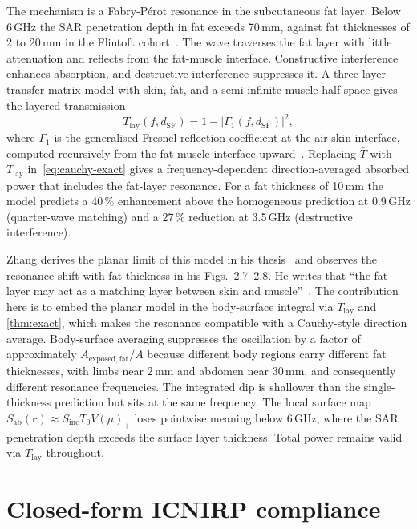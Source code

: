 \documentclass[journal,twocolumn,10pt]{IEEEtran}
\theoremstyle{plain}
\theoremstyle{remark}
\newcommand{\rr}{\mathbf{r}}
\newcommand{\Sinc}{S_{\mathrm{inc}}}
\newcommand{\Sab}{S_{\mathrm{ab}}}
\newcommand{\Tbar}{\bar{T}}
\newcommand{\pospart}[1]{\left(#1\right)_{+}}
\newcommand{\Vis}{V}
\begin{document}
The mechanism is a Fabry-P\'erot resonance in the subcutaneous fat
layer. Below 6\,GHz the SAR penetration depth in fat exceeds 70\,mm,
against fat thicknesses of 2 to 20\,mm in the Flintoft
cohort~\cite[Table~1]{Flintoft2014}. The wave traverses the fat layer
with little attenuation and reflects from the fat-muscle interface.
Constructive interference enhances absorption, and destructive
interference suppresses it. A three-layer transfer-matrix model with
skin, fat, and a semi-infinite muscle half-space gives the layered
transmission
\begin{equation}\label{eq:T-lay}
  T_{\mathrm{lay}}(f, d_{\mathrm{SF}})
  = 1 - \bigl|\widetilde{\Gamma}_1(f, d_{\mathrm{SF}})\bigr|^2,
\end{equation}
where $\widetilde{\Gamma}_1$ is the generalised Fresnel reflection
coefficient at the air-skin interface, computed recursively from the
fat-muscle interface upward~\cite{Chew1995,BornWolf1999}. Replacing
$\Tbar$ with $T_{\mathrm{lay}}$ in~\eqref{eq:cauchy-exact} gives a
frequency-dependent direction-averaged absorbed power that includes
the fat-layer resonance. For a fat thickness of 10\,mm the model
predicts a 40\,\% enhancement above the homogeneous prediction at
0.9\,GHz (quarter-wave matching) and a 27\,\% reduction at 3.5\,GHz
(destructive interference).

Zhang derives the planar limit of this model in his
thesis~\cite[Sec.~2.2]{Zhang2017thesis} and observes the resonance
shift with fat thickness in his Figs.~2.7--2.8. He writes that
``the fat layer may act as a matching layer between skin and
muscle''~\cite[p.~21]{Zhang2017thesis}. The contribution here is to
embed the planar model in the body-surface integral via
$T_{\mathrm{lay}}$ and \cref{thm:exact}, which makes the resonance
compatible with a Cauchy-style direction average. Body-surface
averaging suppresses the oscillation by a factor of approximately
$A_{\mathrm{exposed,fat}}/A$ because different body regions carry
different fat thicknesses, with limbs near 2\,mm and abdomen near
30\,mm, and consequently different resonance frequencies. The
integrated dip is shallower than the single-thickness prediction but
sits at the same frequency. The local surface map
$\Sab(\rr) \approx \Sinc T_0 \Vis \pospart{\mu}$ loses pointwise meaning
below 6\,GHz, where the SAR penetration depth
exceeds the surface layer thickness. Total power remains valid via
$T_{\mathrm{lay}}$ throughout.


\section{Closed-form ICNIRP compliance}\label{sec:compliance}
\end{document}
